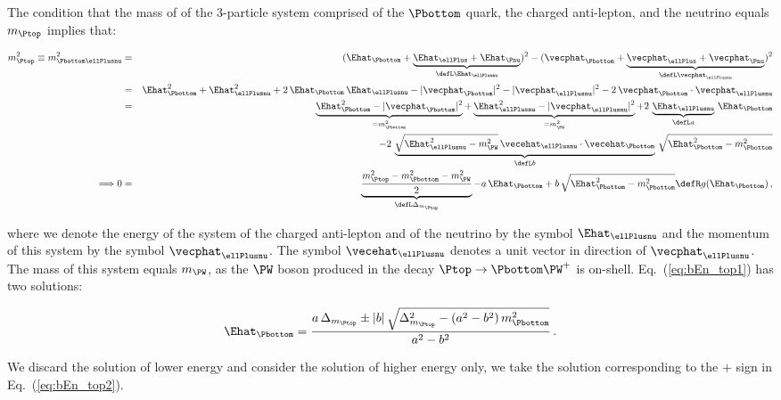 The condition that the mass of of the $3$-particle system comprised of the $\Pbottom$ quark, the charged anti-lepton, and the neutrino equals $m_{\Ptop}$ implies that:
\begin{linenowrapper}
\begin{eqnarray}
m_{\Ptop}^{2} \equiv m_{\Pbottom\ellPlusnu}^{2} 
 & = & ( \Ehat_{\Pbottom} + \underbrace{\Ehat_{\ellPlus} + \Ehat_{\Pnu}}_{\defL \Ehat_{\ellPlusnu}} )^{2} 
- ( \vecphat_{\Pbottom} + \underbrace{\vecphat_{\ellPlus} + \vecphat_{\Pnu}}_{\defL \vecphat_{\ellPlusnu}} )^{2} \nonumber \\
 & = & \Ehat_{\Pbottom}^{2} + \Ehat_{\ellPlusnu}^{2} + 2 \, \Ehat_{\Pbottom} \, \Ehat_{\ellPlusnu} 
- |\vecphat_{\Pbottom}|^{2} - |\vecphat_{\ellPlusnu}|^{2} - 2 \, \vecphat_{\Pbottom} \cdot \vecphat_{\ellPlusnu} \nonumber \\
 & = & \underbrace{\Ehat_{\Pbottom}^{2} - |\vecphat_{\Pbottom}|^{2}}_{= m_{\Pbottom}^{2}} 
+ \underbrace{\Ehat_{\ellPlusnu}^{2} - |\vecphat_{\ellPlusnu}|^{2}}_{= m_{\PW}^{2}} 
+ 2 \, \underbrace{\Ehat_{\ellPlusnu}}_{\defL a} \, \Ehat_{\Pbottom} \nonumber \\
 & & \quad - 2 \, \underbrace{\sqrt{\Ehat_{\ellPlusnu}^{2} - m_{\PW}^{2}} \, \vecehat_{\ellPlusnu} \cdot \vecehat_{\Pbottom}}_{\defL b} \, 
 \sqrt{\Ehat_{\Pbottom}^{2} - m_{\Pbottom}^{2}} \nonumber \\
\Longrightarrow 0 & = & \underbrace{\frac{m_{\Ptop}^{2} - m_{\Pbottom}^{2} - m_{\PW}^{2}}{2}}_{\defL \Delta_{m_{\Ptop}}} - a \, \Ehat_{\Pbottom} + b \, \sqrt{\Ehat_{\Pbottom}^{2} - m_{\Pbottom}^{2}} 
  \defR g(\Ehat_{\Pbottom}) \, ,
\label{eq:bEn_top1}
\end{eqnarray}
\end{linenowrapper}
where we denote the energy of the system of the charged anti-lepton and of the neutrino by the symbol $\Ehat_{\ellPlusnu}$ 
and the momentum of this system by the symbol $\vecphat_{\ellPlusnu}$.
The symbol $\vecehat_{\ellPlusnu}$ denotes a unit vector in direction of $\vecphat_{\ellPlusnu}$.
The mass of this system equals $m_{\PW}$, as the $\PW$ boson produced in the decay $\Ptop \to \Pbottom\PW^{+}$ is on-shell.
Eq.~(\ref{eq:bEn_top1}) has two solutions:
\begin{linenowrapper}
\begin{equation}
\Ehat_{\Pbottom} = \frac{a \, \Delta_{m_{\Ptop}} \pm |b| \, \sqrt{\Delta_{m_{\Ptop}}^{2} - (a^{2} - b^{2}) \, m_{\Pbottom}^{2}}}{a^{2} - b^{2}} \, .
\label{eq:bEn_top2}
\end{equation}
\end{linenowrapper}
We discard the solution of lower energy and consider the solution of higher energy only,
\ie we take the solution corresponding to the $+$ sign in Eq.~(\ref{eq:bEn_top2}).

